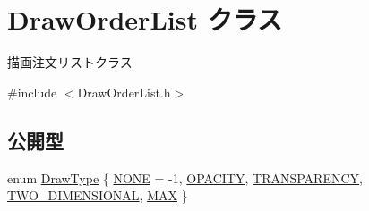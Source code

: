 \hypertarget{class_draw_order_list}{}\section{Draw\+Order\+List クラス}
\label{class_draw_order_list}


描画注文リストクラス  




{\ttfamily \#include $<$Draw\+Order\+List.\+h$>$}

\subsection*{公開型}
\begin{DoxyCompactItemize}
\item 
enum \mbox{\hyperlink{class_draw_order_list_a6c9b9ceb312c16d399ef355f4f3486bb}{Draw\+Type}} \{ \newline
\mbox{\hyperlink{class_draw_order_list_a6c9b9ceb312c16d399ef355f4f3486bbab2a83851af51b7cbf059ef9522ab908f}{N\+O\+NE}} = -\/1, 
\mbox{\hyperlink{class_draw_order_list_a6c9b9ceb312c16d399ef355f4f3486bba4c769c665704d5a6d9a3fa1fa34966fb}{O\+P\+A\+C\+I\+TY}}, 
\mbox{\hyperlink{class_draw_order_list_a6c9b9ceb312c16d399ef355f4f3486bba38e4ff40be41d3ca753da42d6a628173}{T\+R\+A\+N\+S\+P\+A\+R\+E\+N\+CY}}, 
\mbox{\hyperlink{class_draw_order_list_a6c9b9ceb312c16d399ef355f4f3486bba3e5454163533de348e3b3a819e75eb6c}{T\+W\+O\+\_\+\+D\+I\+M\+E\+N\+S\+I\+O\+N\+AL}}, 
\newline
\mbox{\hyperlink{class_draw_order_list_a6c9b9ceb312c16d399ef355f4f3486bba6af2a2923ac1094762cf45ca43fc12ab}{M\+AX}}
 \}
\end{DoxyCompactItemize}
